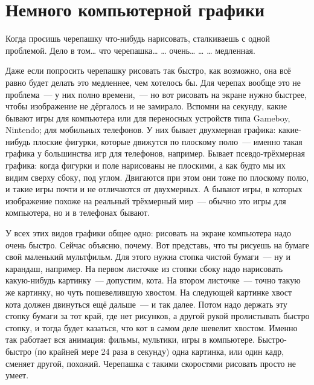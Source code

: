 %
%
%

\chapter{Немного компьютерной графики}\label{ch:abitgraphic}

Когда просишь черепашку что-нибудь нарисовать, сталкиваешь с одной проблемой. Дело в том… что черепашка… … очень… … … медленная.

Даже если попросить черепашку рисовать так быстро, как возможно, она всё равно будет делать это медленнее, чем хотелось бы. Для черепах вообще это не проблема — у них полно времени, — но вот рисовать на экране нужно быстрее, чтобы изображение не дёргалось и не замирало. Вспомни на секунду, какие бывают игры для компьютера или для переносных устройств типа Gameboy, Nintendo; для мобильных телефонов. У них бывает двухмерная графика: какие-нибудь плоские фигурки, которые движутся по плоскому полю — именно такая графика у большинства игр для телефонов, например. Бывает псевдо-трёхмерная графика: когда фигурки и поле нарисованы не плоскими, а как будто мы их видим сверху сбоку, под углом. Двигаются при этом они тоже по плоскому полю, и такие игры почти и не отличаются от двухмерных. А бывают игры, в которых изображение похоже на реальный трёхмерный мир — обычно это игры для компьютера, но и в телефонах бывают.

У всех этих видов графики общее одно: рисовать на экране компьютера надо очень быстро. Сейчас объясню, почему. Вот представь, что ты рисуешь на бумаге свой маленький мультфильм. Для этого нужна стопка чистой бумаги — ну и карандаш, например. На первом листочке из стопки сбоку надо нарисовать какую-нибудь картинку — допустим, кота. На втором листочке — точно такую же картинку, но чуть пошевелившую хвостом. На следующей картинке хвост кота должен двинуться ещё дальше — и так далее. Потом надо держать эту стопку бумаги за тот край, где нет рисунков, а другой рукой пролистывать быстро стопку, и тогда будет казаться, что кот в самом деле шевелит хвостом. Именно так работает вся анимация: фильмы, мультики, игры в компьютере. Быстро-быстро (по крайней мере 24 раза в секунду) одна картинка, или один кадр, сменяет другой, похожий. Черепашка с такими скоростями рисовать просто не умеет.

